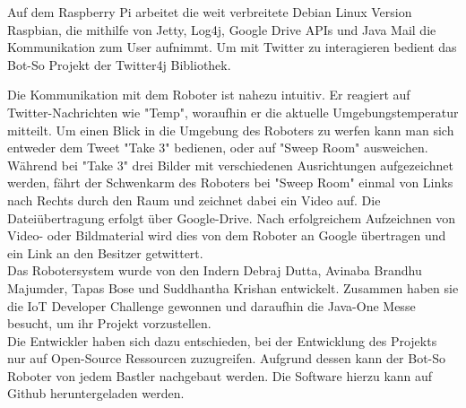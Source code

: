 Auf dem Raspberry Pi arbeitet die weit verbreitete Debian Linux Version Raspbian, die mithilfe von Jetty, Log4j, Google Drive APIs und Java Mail die Kommunikation zum User aufnimmt. Um mit Twitter zu interagieren bedient das Bot-So Projekt der Twitter4j Bibliothek. 

Die Kommunikation mit dem Roboter ist nahezu intuitiv. Er reagiert auf Twitter-Nachrichten wie "Temp", woraufhin er die aktuelle Umgebungstemperatur mitteilt. 
Um einen Blick in die Umgebung des Roboters zu werfen kann man sich entweder dem Tweet "Take 3" bedienen, oder auf "Sweep Room" ausweichen. Während bei "Take 3" drei Bilder mit verschiedenen Ausrichtungen aufgezeichnet werden, fährt der Schwenkarm des Roboters bei "Sweep Room" einmal von Links nach Rechts durch den Raum und zeichnet dabei ein Video auf. 
Die Dateiübertragung erfolgt über Google-Drive. Nach erfolgreichem Aufzeichnen von Video- oder Bildmaterial wird dies von dem Roboter an Google übertragen und ein Link an den Besitzer getwittert.\\


Das Robotersystem wurde von den Indern Debraj Dutta,  Avinaba Brandhu Majumder, Tapas Bose und Suddhantha Krishan entwickelt. Zusammen haben sie die IoT Developer Challenge gewonnen und daraufhin die Java-One Messe besucht, um ihr Projekt vorzustellen.\\

Die Entwickler haben sich dazu entschieden, bei der Entwicklung des Projekts nur auf Open-Source Ressourcen zuzugreifen. Aufgrund dessen kann der Bot-So Roboter von jedem Bastler nachgebaut werden. Die Software hierzu kann auf Github heruntergeladen werden.
